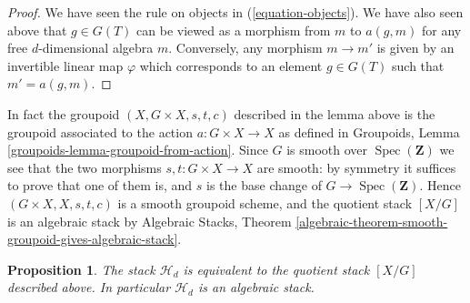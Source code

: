\documentclass{stacks-project}
\theoremstyle{plain}
\newtheorem{proposition}[subsection]{Proposition}
\theoremstyle{definition}
\theoremstyle{remark}
\numberwithin{equation}{subsection}
\def\Spec{\mathop{\mathrm{Spec}}}
\begin{document}
\begin{proof}
We have seen the rule on objects in (\ref{equation-objects}).
We have also seen above that $g \in G(T)$ can be viewed as
a morphism from $m$ to $a(g, m)$ for any free $d$-dimensional algebra $m$.
Conversely, any morphism $m \to m'$ is given by an invertible linear
map $\varphi$ which corresponds to an element $g \in G(T)$ such
that $m' = a(g, m)$.
\end{proof}

\noindent
In fact the groupoid $(X, G \times X, s, t, c)$ described in the
lemma above is the groupoid associated to the action $a : G \times X \to X$
as defined in
Groupoids, Lemma \ref{groupoids-lemma-groupoid-from-action}.
Since $G$ is smooth over $\Spec(\mathbf{Z})$
we see that the two morphisms $s, t : G \times X \to X$ are
smooth: by symmetry it suffices to prove that one of them is, and
$s$ is the base change of $G \to \Spec(\mathbf{Z})$.
Hence $(G \times X, X, s, t, c)$ is a smooth groupoid scheme,
and the quotient stack $[X/G]$ is an algebraic stack by
Algebraic Stacks,
Theorem \ref{algebraic-theorem-smooth-groupoid-gives-algebraic-stack}.

\begin{proposition}
\label{proposition-finite-hilbert-point}
The stack $\mathcal{H}_d$ is equivalent to the quotient stack
$[X/G]$ described above. In particular $\mathcal{H}_d$ is an
algebraic stack.
\end{proposition}
\end{document}
